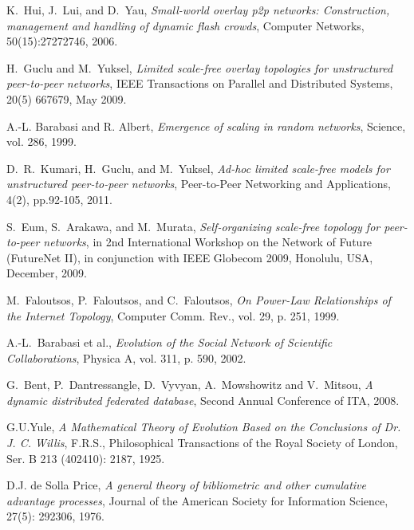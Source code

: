 \documentclass[10pt,journal,cspaper,compsoc]{IEEEtran}
\begin{document}
\begin{thebibliography}{1}

 K.~Hui, J.~Lui, and D.~Yau, \emph{Small-world overlay p2p networks: Construction, management and handling of dynamic
flash crowds}, Computer Networks, 50(15):27272746, 2006.

 H.~Guclu and M.~Yuksel, \emph{Limited scale-free overlay topologies for unstructured peer-to-peer networks}, IEEE Transactions on Parallel and Distributed Systems, 20(5) 667679, May 2009.

A.-L. Barabasi and R. Albert, \emph{Emergence of scaling in random networks}, Science, vol. 286, 1999.


 D.~R.~Kumari, H.~Guclu, and M.~Yuksel, \emph{Ad-hoc limited scale-free models for unstructured peer-to-peer networks}, Peer-to-Peer Networking and Applications, 4(2), pp.92-105, 2011.

 S.~Eum, S.~Arakawa, and M.~Murata, \emph{Self-organizing scale-free topology for peer-to-peer networks}, in 2nd International Workshop on the Network of Future (FutureNet II), in conjunction with IEEE Globecom 2009, Honolulu, USA, December, 2009.

 M.~Faloutsos, P.~Faloutsos, and C.~Faloutsos, \emph{On Power-Law Relationships of the Internet Topology}, Computer Comm. Rev., vol. 29, p. 251, 1999.

 A.-L.~Barabasi et al., \emph{Evolution of the Social Network of Scientific Collaborations}, Physica A, vol. 311, p. 590, 2002.









 G.~Bent, P.~Dantressangle, D.~Vyvyan, A.~Mowshowitz and V.~Mitsou, \emph{A dynamic distributed federated database}, Second Annual Conference of ITA, 2008.

 G.U.Yule, \emph{A Mathematical Theory of Evolution Based on the Conclusions of Dr. J. C. Willis}, F.R.S., Philosophical Transactions of the Royal
Society of London, Ser. B 213 (402410): 2187, 1925.

 D.J. de Solla Price, \emph{A general theory of bibliometric and other cumulative advantage processes}, Journal of the American Society for
Information Science, 27(5): 292306, 1976.







\end{thebibliography}
\end{document}
